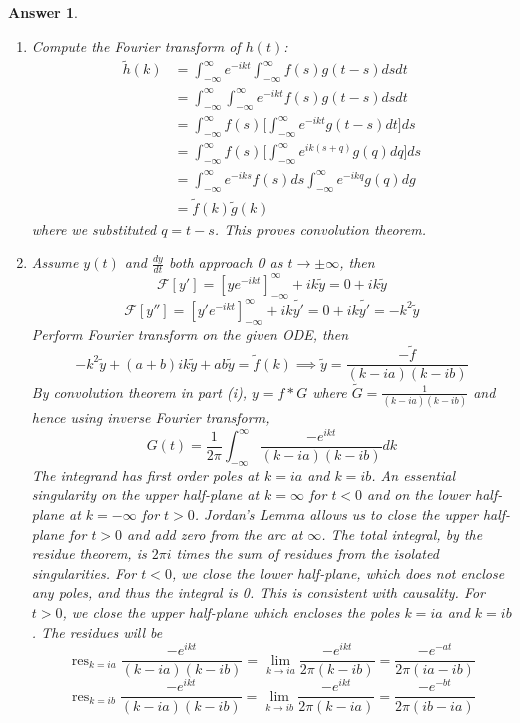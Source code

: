 \documentclass[a4paper]{article}
\DeclareMathOperator{\res}{res}
\newtheorem{ans}{Answer}[section]
\theoremstyle{new}
\begin{document}
\begin{ans}\leavevmode
\begin{enumerate}[label=(\roman*)]
\item Compute the Fourier transform of $h(t)$:
\begin{align}
    \tilde{h}(k)&=\int_{-\infty}^\infty e^{-ikt}\int_{-\infty}^\infty f(s)g(t-s)dsdt\nonumber\\&=\int_{-\infty}^\infty\int_{-\infty}^\infty e^{-ikt}f(s)g(t-s)dsdt\nonumber\\&=\int_{-\infty}^\infty f(s)\bigg[\int_{-\infty}^\infty e^{-ikt}g(t-s)dt\bigg]ds\nonumber\\&=\int_{-\infty}^\infty f(s)\bigg[\int_{-\infty}^\infty e^{ik(s+q)}g(q)dq\bigg]ds\nonumber\\&=\int_{-\infty}^\infty e^{-iks}f(s)ds\int_{-\infty}^\infty e^{-ikq}g(q)dg\nonumber\\&=\tilde{f}(k)\tilde{g}(k)\nonumber
\end{align}
where we substituted $q=t-s$. This proves convolution theorem.
\item Assume $y(t)$ and $\frac{dy}{dt}$ both approach 0 as $t\rightarrow\pm\infty$, then
$$\mathcal{F}[y']=[ye^{-ikt}]_{-\infty}^\infty +ik\tilde{y}=0+ik\tilde{y}$$
$$\mathcal{F}[y'']=[y'e^{-ikt}]_{-\infty}^\infty +ik\tilde{y'}=0+ik\tilde{y'}=-k^2\tilde{y}$$
Perform Fourier transform on the given ODE, then
$$-k^2\tilde{y}+(a+b)ik\tilde{y}+ab\tilde{y}=\tilde{f}(k)\implies\tilde{y}=\frac{-\tilde{f}}{(k-ia)(k-ib)}$$
By convolution theorem in part (i), $y=f*G$ where $\tilde{G}=\frac{1}{(k-ia)(k-ib)}$ and hence using inverse Fourier transform,
$$G(t)=\frac{1}{2\pi}\int_{-\infty}^\infty\frac{-e^{ikt}}{(k-ia)(k-ib)}dk$$
The integrand has first order poles at $k=ia$ and $k=ib$. An essential singularity on the upper half-plane at $k=\infty$ for $t<0$ and on the lower half-plane at $k=-\infty$ for $t>0$. Jordan's Lemma allows us to close the upper half-plane for $t>0$ and add zero from the arc at $\infty$. The total integral, by the residue theorem, is $2\pi i$ times the sum of residues from the isolated singularities. For $t<0$, we close the lower half-plane, which does not enclose any poles, and thus the integral is 0. This is consistent with causality. For $t>0$, we close the upper half-plane which encloses the poles $k=ia$ and $k=ib$. The residues will be
$$\res_{k=ia}\frac{-e^{ikt}}{(k-ia)(k-ib)}=\lim_{k\rightarrow ia}\frac{-e^{ikt}}{2\pi(k-ib)}=\frac{-e^{-at}}{2\pi(ia-ib)}$$
$$\res_{k=ib}\frac{-e^{ikt}}{(k-ia)(k-ib)}=\lim_{k\rightarrow ib}\frac{-e^{ikt}}{2\pi(k-ia)}=\frac{-e^{-bt}}{2\pi(ib-ia)}$$

\end{enumerate}
\end{ans}
\end{document}
